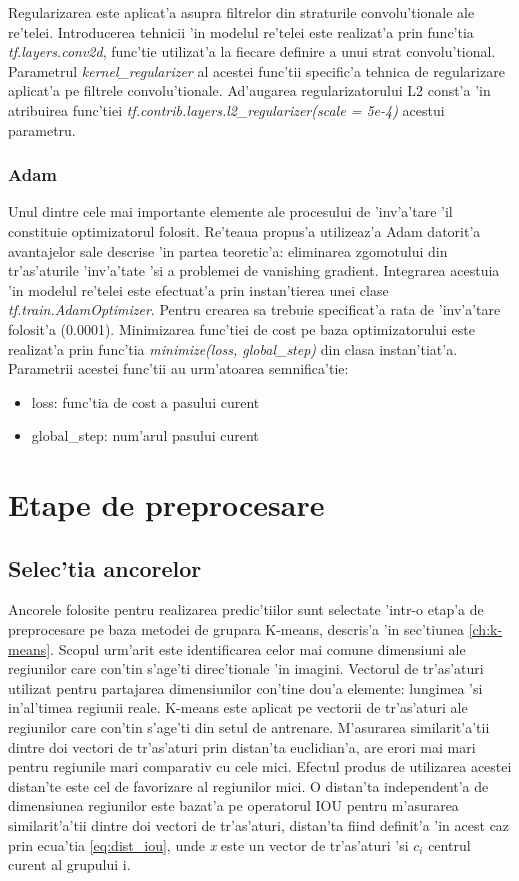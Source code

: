 \documentclass[12pt,a4paper,twoside]{report}
\begin{document}
Regularizarea este aplicat'a asupra filtrelor din straturile convolu'tionale ale re'telei. Introducerea tehnicii 'in modelul re'telei este realizat'a prin func'tia \textit{tf.layers.conv2d}, func'tie utilizat'a la fiecare definire a unui strat convolu'tional. Parametrul \textit{kernel\_regularizer} al acestei func'tii specific'a tehnica de regularizare aplicat'a pe filtrele convolu'tionale. Ad'augarea regularizatorului L2 const'a 'in atribuirea func'tiei \textit{ tf.contrib.layers.l2\_regularizer(scale = 5e-4)} acestui parametru.

\subsubsection{Adam}
Unul dintre cele mai importante elemente ale procesului de 'inv'a'tare 'il constituie optimizatorul folosit. Re'teaua propus'a utilizeaz'a Adam datorit'a avantajelor sale descrise 'in partea teoretic'a: eliminarea zgomotului din tr'as'aturile 'inv'a'tate 'si a problemei de vanishing gradient. Integrarea acestuia 'in modelul re'telei este efectuat'a prin instan'tierea unei clase \textit{tf.train.AdamOptimizer}. Pentru crearea sa trebuie specificat'a rata de 'inv'a'tare folosit'a (0.0001). Minimizarea func'tiei de cost pe baza optimizatorului este realizat'a prin func'tia \textit{minimize(loss, global\_step)} din clasa instan'tiat'a. Parametrii acestei func'tii au urm'atoarea semnifica'tie:
\begin{itemize}
\item loss: func'tia de cost a pasului curent
\item global\_step: num'arul pasului curent
\end{itemize}

\section{Etape de preprocesare}
\subsection{Selec'tia ancorelor}
Ancorele folosite pentru realizarea predic'tiilor sunt selectate 'intr-o etap'a de preprocesare pe baza metodei de grupara K-means, descris'a 'in sec'tiunea \ref{ch:k-means}. Scopul urm'arit este identificarea celor mai comune dimensiuni ale regiunilor care con'tin s'age'ti direc'tionale 'in imagini. Vectorul de tr'as'aturi utilizat pentru partajarea dimensiunilor con'tine dou'a elemente: lungimea 'si in'al'timea regiunii reale. K-means este aplicat pe vectorii de tr'as'aturi ale regiunilor care con'tin s'age'ti din setul de antrenare. M'asurarea similarit'a'tii dintre doi vectori de tr'as'aturi prin distan'ta euclidian'a, are erori mai mari pentru regiunile mari comparativ cu cele mici. Efectul produs de utilizarea acestei distan'te este cel de favorizare al regiunilor mici. O distan'ta independent'a de dimensiunea regiunilor este bazat'a pe operatorul IOU pentru m'asurarea similarit'a'tii dintre doi vectori de tr'as'aturi, distan'ta fiind definit'a 'in acest caz prin ecua'tia \ref{eq:dist_iou}, unde \textit{x} este un vector de tr'as'aturi 'si $c_i$ centrul curent al grupului i.
\end{document}

